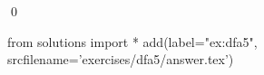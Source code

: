 
\begin{ex} 
  \label{ex:dfa5}
  
  \qed
\end{ex} 
\begin{python0}
from solutions import *
add(label="ex:dfa5",
    srcfilename='exercises/dfa5/answer.tex') 
\end{python0}
